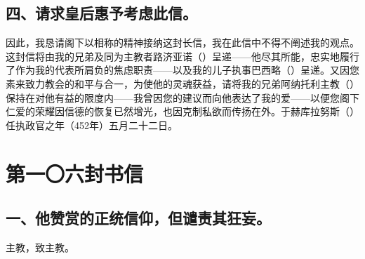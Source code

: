 
\subsection{四、请求皇后惠予考虑此信。}

因此，我恳请阁下以相称的精神接纳这封长信，我在此信中不得不阐述我的观点。这封信将由我的兄弟及同为主教者路济亚诺（）呈递——他尽其所能，忠实地履行了作为我的代表所肩负的焦虑职责——以及我的儿子执事巴西略（）呈递。又因您素来致力教会的和平与合一，为使他的灵魂获益，请将我的兄弟阿纳托利主教（）保持在对他有益的限度内——我曾因您的建议而向他表达了我的爱——以便您阁下仁爱的荣耀因信德的恢复已然增光，也因克制私欲而传扬在外。于赫库拉努斯（）任执政官之年（452年）五月二十二日。\par



\section{第一〇六封书信}

\par


\subsection{一、他赞赏的正统信仰，但谴责其狂妄。}

主教，致主教。\par

